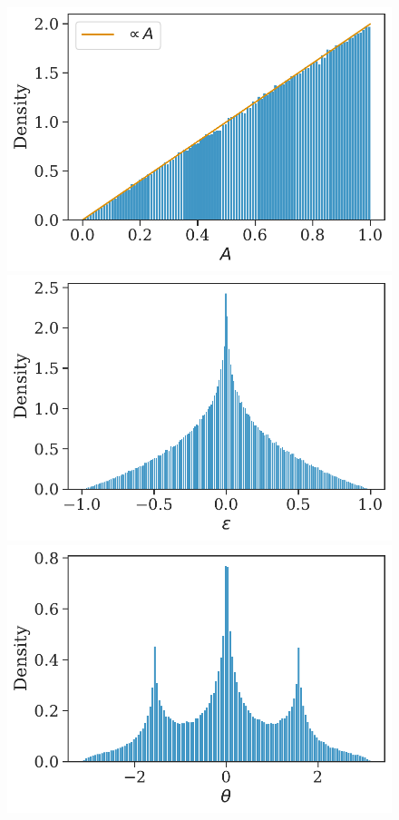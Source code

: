 \documentclass[aps,prd,twocolumn,superscriptaddress,preprintnumbers,floatfix,nofootinbib]{revtex4-2}
\begin{document}
\begin{figure}
\includegraphics[width=\columnwidth]{jac_Aellip_Aphi_A}
\includegraphics[width=\columnwidth]{jac_Aellip_Aphi_epsilon}\\
\includegraphics[width=\columnwidth]{jac_Aellip_Aphi_theta}

\end{figure}
\end{document}
